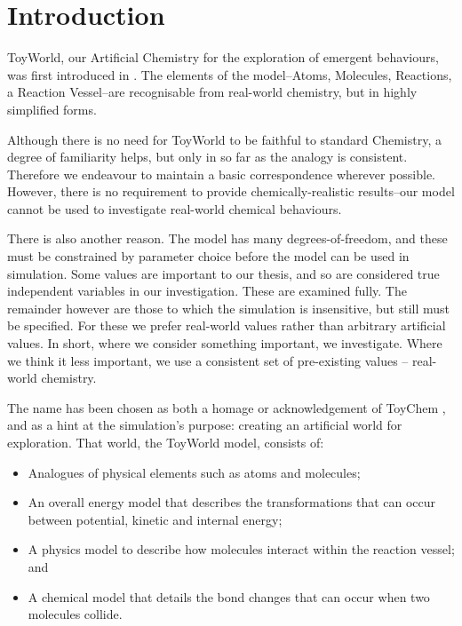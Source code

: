 \section{Introduction}\label{introduction-3}

ToyWorld, our Artificial Chemistry for the exploration of emergent
behaviours, was first introduced in \autocite{Young2013}. The elements
of the model--Atoms, Molecules, Reactions, a Reaction Vessel--are
recognisable from real-world chemistry, but in highly simplified forms.

Although there is no need for ToyWorld to be faithful to standard
Chemistry, a degree of familiarity helps, but only in so far as the
analogy is consistent. Therefore we endeavour to maintain a basic
correspondence wherever possible. However, there is no requirement to
provide chemically-realistic results--our model cannot be used to
investigate real-world chemical behaviours.

There is also another reason. The model has many degrees-of-freedom, and
these must be constrained by parameter choice before the model can be
used in simulation. Some values are important to our thesis, and so are
considered true independent variables in our investigation. These are
examined fully. The remainder however are those to which the simulation
is insensitive, but still must be specified. For these we prefer
real-world values rather than arbitrary artificial values. In short,
where we consider something important, we investigate. Where we think it
less important, we use a consistent set of pre-existing values --
real-world chemistry.

The name has been chosen as both a homage or acknowledgement of ToyChem
\autocite{Benko2003}, and as a hint at the simulation's purpose:
creating an artificial world for exploration. That world, the ToyWorld
model, consists of:

\begin{itemize}
	\item
 Analogues of physical elements such as atoms and molecules;
	\item
 An overall energy model that describes the transformations that can
 occur between potential, kinetic and internal energy;
	\item
 A physics model to describe how molecules interact within the reaction
 vessel; and
	\item
 A chemical model that details the bond changes that can occur when two
 molecules collide.
\end{itemize}

